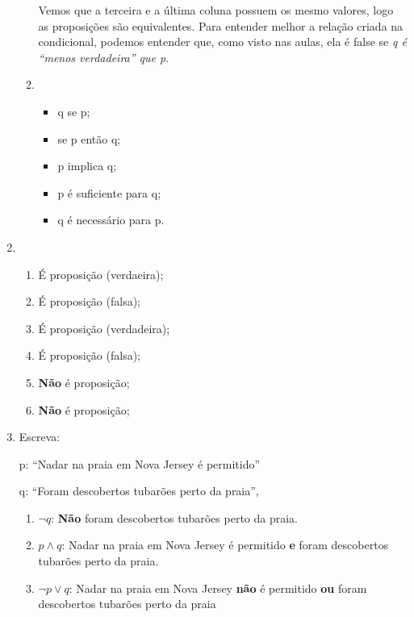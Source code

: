 \documentclass[12pt]{article}
\begin{document}
\begin{enumerate}
\begin{enumerate}
                Vemos que a terceira e a última coluna possuem os mesmo valores, logo as proposições são equivalentes. Para entender melhor a relação criada na condicional, podemos entender que, como visto nas aulas, ela é false se \textit{q é ``menos verdadeira'' que p}.

            \item 
                \begin{itemize}
                    \item q se p;
                    \item se p então q;
                    \item p implica q;
                    \item p é suficiente para q;
                    \item q é necessário para p.
                \end{itemize}
        \end{enumerate}
    \item 
        \begin{enumerate}
            \item É proposição (verdaeira);
            \item É proposição (falsa);
            \item É proposição (verdadeira);
            \item É proposição (falsa);
            \item \textbf{Não} é proposição;
            \item \textbf{Não} é proposição;
        \end{enumerate}
    \item Escreva:

        \begin{center}
            p: “Nadar na praia em Nova Jersey é permitido”

            q: “Foram descobertos tubarões perto da praia”, 
        \end{center}

        \begin{enumerate}
            \item \( \neg q \): \textbf{Não} foram descobertos tubarões perto da praia.

            \item \( p \land q \): Nadar na praia em Nova Jersey é permitido \textbf{e} foram descobertos tubarões perto da praia.

            \item \( \neg p \lor q \): Nadar na praia em Nova Jersey \textbf{não} é permitido \textbf{ou} foram descobertos tubarões perto da praia


\end{enumerate}
\end{enumerate}
\end{document}
